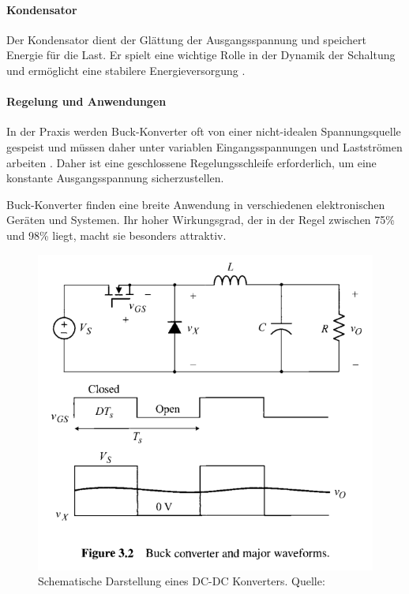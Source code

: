 \paragraph{Kondensator}
Der Kondensator dient der Glättung der Ausgangsspannung und speichert Energie für die Last. Er spielt eine wichtige Rolle in der Dynamik der Schaltung und ermöglicht eine stabilere Energieversorgung \cite{Kularatna2012}.
\paragraph{Regelung und Anwendungen}

In der Praxis werden Buck-Konverter oft von einer nicht-idealen Spannungsquelle gespeist und müssen daher unter variablen Eingangsspannungen und Lastströmen arbeiten \cite{choi2013pulsewidth}. Daher ist eine geschlossene Regelungsschleife erforderlich, um eine konstante Ausgangsspannung sicherzustellen.

Buck-Konverter finden eine breite Anwendung in verschiedenen elektronischen Geräten und Systemen. Ihr hoher Wirkungsgrad, der in der Regel zwischen 75\% und 98\% liegt, macht sie besonders attraktiv.


\begin{figure}[htbp]
    \centering
    \includegraphics[width=0.4\linewidth]{2Grundlagen/111DCDC.png}
    \caption{Schematische Darstellung eines DC-DC Konverters. Quelle: \cite{choi2013pulsewidth}}
    \label{fig:dcdc_converter}
\end{figure}




